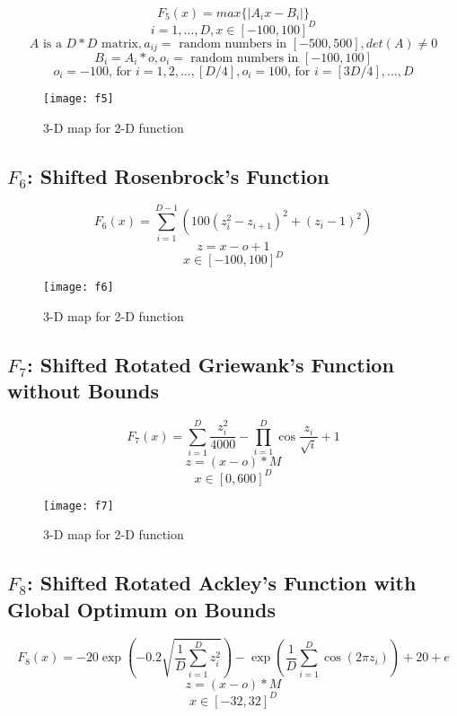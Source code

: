 \begin{equation}
  F_5(x)=max\{|A_ix-B_i|\}
\end{equation}
\[ i=1,...,D, x \in [-100,100]^D \]
\[ A \text{ is a } D*D \text{ matrix}, a_{ij} = \text{ random numbers in } [-500,500],  det(A) \neq 0 \]
\[ B_i = A_i * o, o_i = \text{ random numbers in } [-100,100] \]
\[ o_i = -100 \text{, for } i=1,2,...,[D/4], o_i = 100 \text{, for } i=[3D/4],...,D \]

\begin{figure}[H]
  \centering
  \texttt{[image: f5]}
  \caption{3-D map for 2-D function}
  \label{f5}
\end{figure}

\subsection{$F_6$: Shifted Rosenbrock’s Function}

\begin{equation}
  F_6(x)=\sum_{i=1}^{D-1}{(100(z_i^2 - z_{i+1})^2 + (z_i - 1)^2)}
\end{equation}
\[ z=x-o+1 \]
\[ x \in [-100,100]^D \]

\begin{figure}[H]
  \centering
  \texttt{[image: f6]}
  \caption{3-D map for 2-D function}
  \label{f6}
\end{figure}

\subsection{$F_7$: Shifted Rotated Griewank’s Function without Bounds}

\begin{equation}
  F_7(x)=\sum_{i=1}^{D}{\frac{z_i^2}{4000}}-\prod_{i=1}^{D}{\cos{\frac{z_i}{\sqrt{i}}}}+1
\end{equation}
\[ z=(x-o)*M \]
\[ x \in [0,600]^D \]

\begin{figure}[H]
  \centering
  \texttt{[image: f7]}
  \caption{3-D map for 2-D function}
  \label{f7}
\end{figure}

\subsection{$F_8$: Shifted Rotated Ackley’s Function with Global Optimum on Bounds}

\begin{equation}
  F_8(x)=-20\exp{(-0.2\sqrt{\frac{1}{D}\sum_{i=1}^{D}{z_i^2}})}-\exp{(\frac{1}{D}\sum_{i=1}^{D}{\cos{(2\pi z_i)}})} + 20 + e
\end{equation}
\[ z=(x-o)*M \]
\[ x \in [-32,32]^D \]

